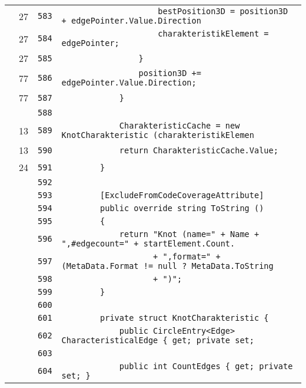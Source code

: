 \documentclass[a4paper,10pt]{article}
\begin{document}
\begin{longtable}[l]{lrrl}
\cellcolor{green} & 27 & \verb~583~ & \verb~                    bestPosition3D = position3D + edgePointer.Value.Direction ~\\
\cellcolor{green} & 27 & \verb~584~ & \verb~                    charakteristikElement = edgePointer;~\\
\cellcolor{green} & 27 & \verb~585~ & \verb~                }~\\
\cellcolor{green} & 77 & \verb~586~ & \verb~                position3D += edgePointer.Value.Direction;~\\
\cellcolor{green} & 77 & \verb~587~ & \verb~            }~\\
\cellcolor{gray} &  & \verb~588~ & \verb~~\\
\cellcolor{green} & 13 & \verb~589~ & \verb~            CharakteristicCache = new KnotCharakteristic (charakteristikElemen~\\
\cellcolor{green} & 13 & \verb~590~ & \verb~            return CharakteristicCache.Value;~\\
\cellcolor{green} & 24 & \verb~591~ & \verb~        }~\\
\cellcolor{gray} &  & \verb~592~ & \verb~~\\
\cellcolor{gray} &  & \verb~593~ & \verb~        [ExcludeFromCodeCoverageAttribute]~\\
\cellcolor{gray} &  & \verb~594~ & \verb~        public override string ToString ()~\\
\cellcolor{gray} &  & \verb~595~ & \verb~        {~\\
\cellcolor{gray} &  & \verb~596~ & \verb~            return "Knot (name=" + Name + ",#edgecount=" + startElement.Count.~\\
\cellcolor{gray} &  & \verb~597~ & \verb~                   + ",format=" + (MetaData.Format != null ? MetaData.ToString~\\
\cellcolor{gray} &  & \verb~598~ & \verb~                   + ")";~\\
\cellcolor{gray} &  & \verb~599~ & \verb~        }~\\
\cellcolor{gray} &  & \verb~600~ & \verb~~\\
\cellcolor{gray} &  & \verb~601~ & \verb~        private struct KnotCharakteristic {~\\
\cellcolor{gray} &  & \verb~602~ & \verb~            public CircleEntry<Edge> CharacteristicalEdge { get; private set; ~\\
\cellcolor{gray} &  & \verb~603~ & \verb~~\\
\cellcolor{gray} &  & \verb~604~ & \verb~            public int CountEdges { get; private set; }~\\

\end{longtable}
\end{document}
